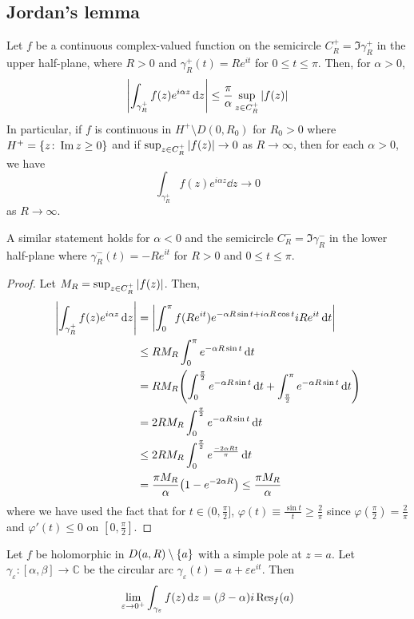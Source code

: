 \subsection{Jordan's lemma}
\begin{lemma}
	Let \( f \) be a continuous complex-valued function on the semicircle \( C_R^+ = \Im \gamma_R^+ \) in the upper half-plane, where \( R > 0 \) and \( \gamma_R^+(t) = Re^{it} \) for \( 0 \leq t \leq \pi \).
	Then, for \( \alpha > 0 \),
	\[ \abs{\int_{\gamma_R^+} f(z) e^{i\alpha z} \dd{z}} \leq \frac{\pi}{\alpha} \sup_{z \in C_R^+} \abs{f(z)} \]
	In particular, if \( f \) is continuous in \( H^+ \setminus D(0,R_0) \) for \( R_0 > 0 \) where \( H^+ = \qty{z \colon \Im z \geq 0} \) and if \( \sup_{z \in C_R^+} \abs{f(z)} \to 0 \) as \( R \to \infty \), then for each \( \alpha > 0 \), we have
	\[ \int_{\gamma_R^+} f(z) e^{i\alpha z} \dd{z} \to 0 \]
	as \( R \to \infty \).
\end{lemma}
A similar statement holds for \( \alpha < 0 \) and the semicircle \( C_R^- = \Im \gamma_R^- \) in the lower half-plane where \( \gamma_R^-(t) = -Re^{it} \) for \( R > 0 \) and \( 0 \leq t \leq \pi \).
\begin{proof}
	Let \( M_R = \sup_{z \in C_R^+} \abs{f(z)} \).
	Then,
	\begin{align*}
		\abs{\int_{\gamma_R^+} f(z) e^{i\alpha z} \dd{z}} &= \abs{\int_0^\pi f(Re^{it}) e^{-\alpha R \sin t + i\alpha R \cos t}iRe^{it} \dd{t}} \\
		&\leq RM_R \int_0^\pi e^{-\alpha R \sin t} \dd{t} \\
		&= RM_R \qty( \int_0^{\frac{\pi}{2}} e^{-\alpha R \sin t} \dd{t} + \int_{\frac{\pi}{2}}^\pi e^{-\alpha R \sin t} \dd{t} ) \\
		&= 2RM_R \int_0^{\frac{\pi}{2}} e^{-\alpha R \sin t} \dd{t} \\
		&\leq 2 RM_R \int_0^{\frac{\pi}{2}} e^{\frac{-2\alpha R t}{\pi}} \dd{t} \\
		&= \frac{\pi M_R}{\alpha} \qty(1 - e^{-2\alpha R}) \leq \frac{\pi M_R}{\alpha}
	\end{align*}
	where we have used the fact that for \( t \in (0,\frac{\pi}{2}] \), \( \varphi(t) \equiv \frac{\sin t}{t} \geq \frac{2}{\pi} \) since \( \varphi(\frac{\pi}{2}) = \frac{2}{\pi} \) and \( \varphi'(t) \leq 0 \) on \( [0,\frac{\pi}{2}] \).
\end{proof}
\begin{lemma}
	Let \( f \) be holomorphic in \( D(a,R) \setminus \qty{a} \) with a simple pole at \( z = a \).
	Let \( \gamma_\varepsilon \colon [\alpha,\beta] \to \mathbb C \) be the circular arc \( \gamma_\varepsilon(t) = a + \varepsilon e^{it} \).
	Then
	\[ \lim_{\varepsilon \to 0^+} \int_{\gamma_\varepsilon} f(z) \dd{z} = (\beta - \alpha) i \Res_f(a)\]
\end{lemma}
